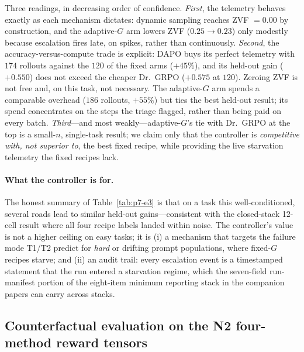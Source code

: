 \documentclass{article}
\begin{document}
Three readings, in decreasing order of confidence. \emph{First}, the
telemetry behaves exactly as each mechanism dictates: dynamic sampling
reaches ZVF $= 0.00$ by construction, and the adaptive-$G$ arm lowers ZVF
($0.25 \to 0.23$) only modestly because escalation fires late, on spikes,
rather than continuously. \emph{Second}, the accuracy-versus-compute trade
is explicit: DAPO buys its perfect telemetry with $174$ rollouts against the
$120$ of the fixed arms ($+45\%$), and its held-out gain ($+0.550$) does not
exceed the cheaper Dr.~GRPO ($+0.575$ at $120$). Zeroing ZVF is not free
and, on this task, not necessary. The adaptive-$G$ arm spends a comparable
overhead ($186$ rollouts, $+55\%$) but ties the best held-out result; its
spend concentrates on the steps the triage flagged, rather than being paid
on every batch. \emph{Third}---and most weakly---adaptive-$G$'s tie with
Dr.~GRPO at the top is a small-$n$, single-task result; we claim only that
the controller is \emph{competitive with, not superior to}, the best fixed
recipe, while providing the live starvation telemetry the fixed recipes
lack.

\paragraph{What the controller is for.} The honest summary of
Table~\ref{tab:p7-e3} is that on a task this well-conditioned, several roads
lead to similar held-out gains---consistent with the closed-stack 12-cell
result where all four recipe labels landed within noise. The controller's
value is not a higher ceiling on easy tasks; it is (i) a mechanism that
targets the failure mode T1/T2 predict for \emph{hard} or drifting prompt
populations, where fixed-$G$ recipes starve; and (ii) an audit trail: every
escalation event is a timestamped statement that the run entered a
starvation regime, which the seven-field run-manifest portion of the
eight-item minimum reporting stack in the
companion papers can carry across stacks.

\subsection{Counterfactual evaluation on the N2 four-method reward tensors}
\label{sec:p7-controller-cf}
\end{document}
